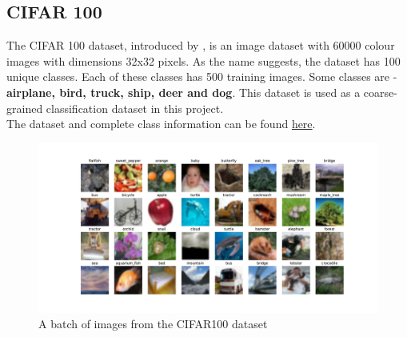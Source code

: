 \subsection{CIFAR 100}
The CIFAR 100 dataset, introduced by \cite{krizhevskyLearningMultipleLayers}, is an image dataset with 60000 colour images with dimensions 32x32 pixels. As the name suggests, the dataset has 100 unique classes. Each of these classes has 500 training images. Some classes are - \textbf{airplane, bird, truck, ship, deer and dog}. This dataset is used as a coarse-grained classification dataset in this project.\\
The dataset and complete class information can be found \href{https://www.kaggle.com/datasets/fedesoriano/cifar100}{here}.

\begin{figure}[H]
    \centering
    \includegraphics[width=1\textwidth]{images/cifar100.pdf}
    \caption{A batch of images from the CIFAR100 dataset}
    \label{fig:cifar100}
\end{figure}

